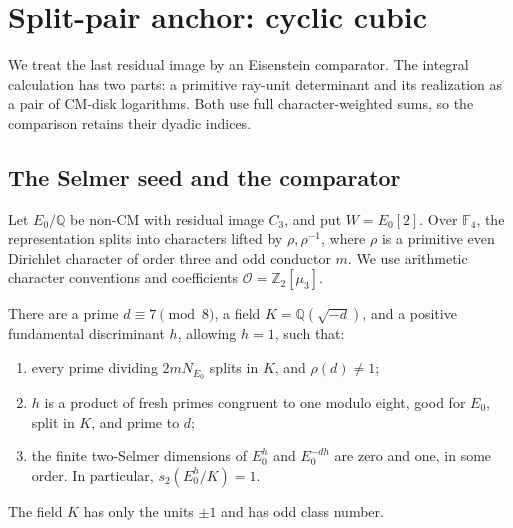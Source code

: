 \section{Split-pair anchor: cyclic cubic}\label{sec:cyclic}

We treat the last residual image by an Eisenstein comparator.  The
integral calculation has two parts: a primitive ray-unit determinant
and its realization as a pair of CM-disk logarithms.  Both use full
character-weighted sums, so the comparison retains their dyadic
indices.

\subsection{The Selmer seed and the comparator}

Let \(E_0/\mathbb Q\) be non-CM with residual image \(C_3\), and put
\(W=E_0[2]\).  Over \(\mathbb F_4\), the representation splits into
characters lifted by \(\rho,\rho^{-1}\), where \(\rho\) is a primitive
even Dirichlet character of order three and odd conductor \(m\).
We use arithmetic character conventions and coefficients
\(\mathcal O=\mathbb Z_2[\mu_3]\).

\begin{lemma}\label{cyclic:seed}
There are a prime \(d\equiv7\pmod8\), a field
\(K=\mathbb Q(\sqrt{-d})\), and a positive fundamental discriminant
\(h\), allowing \(h=1\), such that:
\begin{enumerate}[label=\textup{(\roman*)}]
\item every prime dividing \(2mN_{E_0}\) splits in \(K\), and
      \(\rho(d)\ne1\);
\item \(h\) is a product of fresh primes congruent to one modulo eight,
      good for \(E_0\), split in \(K\), and prime to \(d\);
\item the finite two-Selmer dimensions of \(E_0^h\) and
      \(E_0^{-dh}\) are zero and one, in some order.  In particular,
      \(s_2(E_0^h/K)=1\).
\end{enumerate}
The field \(K\) has only the units \(\pm1\) and has odd class number.
\end{lemma}

